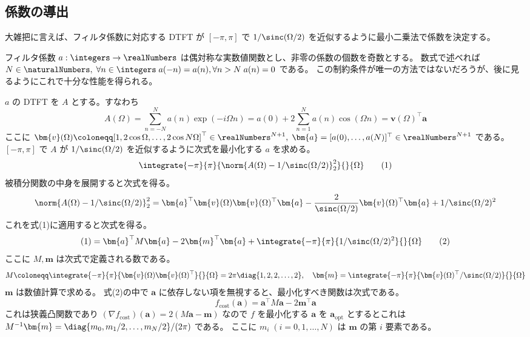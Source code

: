         \subsection{係数の導出}
            大雑把に言えば、フィルタ係数に対応する DTFT が $[-\pi,\pi]$ で $1/\sinc(\Omega/2)$ を近似するように最小二乗法で係数を決定する。
            \par
            フィルタ係数 $a:\integers\to\realNumbers$ は偶対称な実数値関数とし、非零の係数の個数を奇数とする。
            数式で述べれば $N\in\naturalNumbers,\;\forall n\in\integers\;a(-n) = a(n),\forall n>N\;a(n) = 0$ である。
            この制約条件が唯一の方法ではないだろうが、後に見るようにこれで十分な性能を得られる。
            \par
            $a$ の DTFT を $A$ とする。すなわち
            \[ A(\Omega) = \sum_{n=-N}^N a(n)\exp(-i\Omega n) = a(0) + 2\sum_{n=1}^N a(n)\cos(\Omega n) = \bm{v}(\Omega)^\top\bm{a} \]
            ここに $\bm{v}(\Omega) \coloneqq [1, 2\cos\Omega,\dots,2\cos N\Omega]^\top\in\realNumbers^{N+1},\;\bm{a} = [a(0),\dots,a(N)]^\top\in\realNumbers^{N+1}$ である。
            $[-\pi,\pi]$ で $A$ が $1/\sinc(\Omega/2)$ を近似するように次式を最小化する $a$ を求める。
            \[ \integrate{-\pi}{\pi}{\norm{A(\Omega) - 1/\sinc(\Omega/2)}_2^2}{}{\Omega} \tag{1} \]
            被積分関数の中身を展開すると次式を得る。
            \[ \norm{A(\Omega) - 1/\sinc(\Omega/2)}_2^2 = \bm{a}^\top\bm{v}(\Omega)\bm{v}(\Omega)^\top\bm{a} - \frac{2}{\sinc(\Omega/2)}\bm{v}(\Omega)^\top\bm{a} + 1/\sinc(\Omega/2)^2 \]
            これを式(1)に適用すると次式を得る。
            \[ (1) = \bm{a}^\top M\bm{a} - 2\bm{m}^\top\bm{a} + \integrate{-\pi}{\pi}{1/\sinc(\Omega/2)^2}{}{\Omega} \tag{2} \]
            ここに $M,\bm{m}$ は次式で定義される数である。
            \[ M \coloneqq \integrate{-\pi}{\pi}{\bm{v}(\Omega)\bm{v}(\Omega)^\top}{}{\Omega} = 2\pi\diag{1,2,2,\dots,2},\quad \bm{m} = \integrate{-\pi}{\pi}{\bm{v}(\Omega)^\top/\sinc(\Omega/2)}{}{\Omega} \]
            $\bm{m}$ は数値計算で求める。
            式(2)の中で $\bm{a}$ に依存しない項を無視すると、最小化すべき関数は次式である。
            \[ f_\text{cost}(\bm{a}) = \bm{a}^\top M\bm{a} - 2\bm{m}^\top\bm{a} \]
            これは狭義凸関数であり $(\nabla f_\text{cost})(\bm{a}) = 2(M\bm{a} - \bm{m})$ なので $f$ を最小化する $\bm{a}$ を $\bm{a}_\text{opt}$ とするとこれは $M^{-1}\bm{m} = \diag{m_0,m_1 /2,\dots,m_N /2}/(2\pi)$ である。
            ここに $m_i\;(i=0,1,\dots,N)$ は $\bm{m}$ の第 $i$ 要素である。
